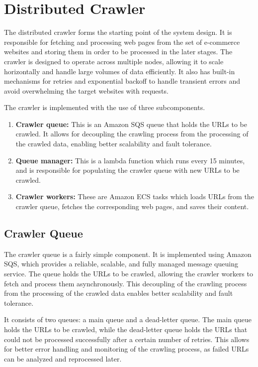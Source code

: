 \section{Distributed Crawler}\label{sec:distributed_crawler}

The distributed crawler forms the starting point of the system design.
It is responsible for fetching and processing web pages from the set of e-commerce websites and storing them in order to be processed in the later stages.
The crawler is designed to operate across multiple nodes, allowing it to scale horizontally and handle large volumes of data efficiently.
It also has built-in mechanisms for retries and exponential backoff to handle transient errors and avoid overwhelming the target websites with requests.

The crawler is implemented with the use of three subcomponents.
\begin{enumerate}
    \item \textbf{Crawler queue:} This is an Amazon SQS queue that holds the URLs to be crawled.
    It allows for decoupling the crawling process from the processing of the crawled data, enabling better scalability and fault tolerance.
    \item \textbf{Queue manager:} This is a lambda function which runs every 15 minutes, and is responsible for populating the crawler queue with new URLs to be crawled.
    \item \textbf{Crawler workers:} These are Amazon ECS tasks which loads URLs from the crawler queue, fetches the corresponding web pages, and saves their content.
\end{enumerate}

\subsection{Crawler Queue}\label{subsec:crawler-queue}
The crawler queue is a fairly simple component.
It is implemented using Amazon SQS, which provides a reliable, scalable, and fully managed message queuing service.
The queue holds the URLs to be crawled, allowing the crawler workers to fetch and process them asynchronously.
This decoupling of the crawling process from the processing of the crawled data enables better scalability and fault tolerance.

It consists of two queues: a main queue and a dead-letter queue.
The main queue holds the URLs to be crawled, while the dead-letter queue holds the URLs that could not be processed successfully after a certain number of retries.
This allows for better error handling and monitoring of the crawling process, as failed URLs can be analyzed and reprocessed later.

